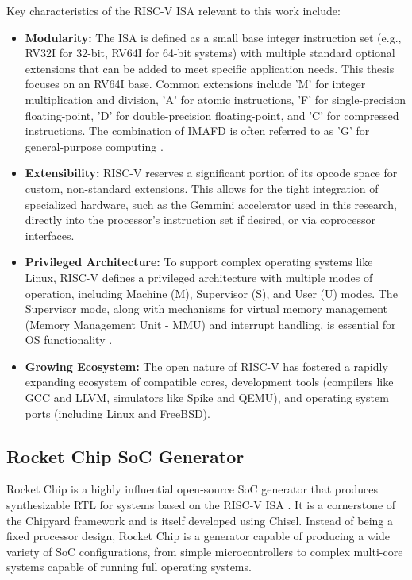 Key characteristics of the RISC-V ISA relevant to this work include:
\begin{itemize}
    \item \textbf{Modularity:} The ISA is defined as a small base integer instruction set (e.g., RV32I for 32-bit, RV64I for 64-bit systems) with multiple standard optional extensions that can be added to meet specific application needs. This thesis focuses on an RV64I base. Common extensions include 'M' for integer multiplication and division, 'A' for atomic instructions, 'F' for single-precision floating-point, 'D' for double-precision floating-point, and 'C' for compressed instructions. The combination of IMAFD is often referred to as 'G' for general-purpose computing \cite{asanovic2016rocketchip}.

    \item \textbf{Extensibility:} RISC-V reserves a significant portion of its opcode space for custom, non-standard extensions. This allows for the tight integration of specialized hardware, such as the Gemmini accelerator used in this research, directly into the processor's instruction set if desired, or via coprocessor interfaces.

    \item \textbf{Privileged Architecture:} To support complex operating systems like Linux, RISC-V defines a privileged architecture with multiple modes of operation, including Machine (M), Supervisor (S), and User (U) modes. The Supervisor mode, along with mechanisms for virtual memory management (Memory Management Unit - MMU) and interrupt handling, is essential for OS functionality \cite{waterman2015riscvpriv}.

    \item \textbf{Growing Ecosystem:} The open nature of RISC-V has fostered a rapidly expanding ecosystem of compatible cores, development tools (compilers like GCC and LLVM, simulators like Spike and QEMU), and operating system ports (including Linux and FreeBSD).
\end{itemize}

\subsection{Rocket Chip SoC Generator}
\label{sec:rocketchip_generator}

Rocket Chip is a highly influential open-source SoC generator that produces synthesizable RTL for systems based on the RISC-V ISA \cite{asanovic2016rocketchip}. It is a cornerstone of the Chipyard framework and is itself developed using Chisel. Instead of being a fixed processor design, Rocket Chip is a generator capable of producing a wide variety of SoC configurations, from simple microcontrollers to complex multi-core systems capable of running full operating systems.

